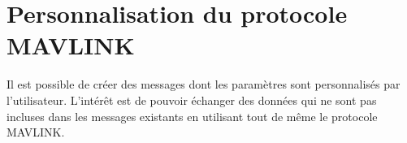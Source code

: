 \section{Personnalisation du protocole MAVLINK }

Il est possible de créer des messages dont les paramètres sont personnalisés par l'utilisateur. L'intérêt est de pouvoir échanger des données qui ne sont pas incluses dans les messages existants en utilisant tout de même le protocole MAVLINK. 

